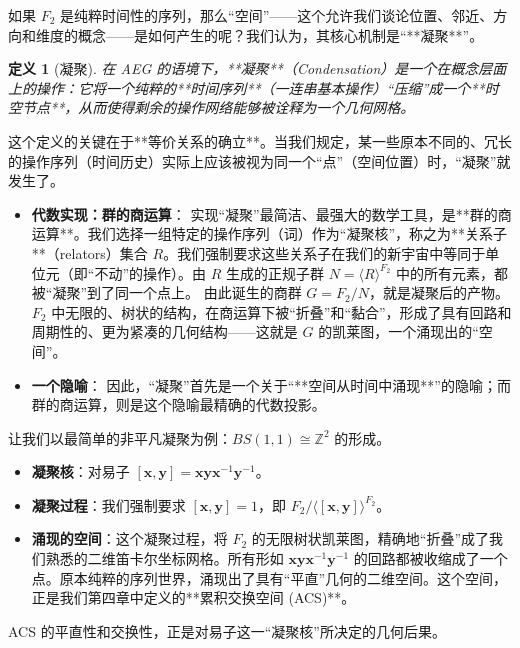 \documentclass[a4paper,12pt]{book}
\numberwithin{problem}{section}
\newtheorem{definition}{定义}
\numberwithin{definition}{section}
\numberwithin{lemma}{section}
\numberwithin{proposition}{section}
\numberwithin{theorem}{section}
\numberwithin{grammar}{section}
\numberwithin{program}{section}
\numberwithin{convention}{section}
\numberwithin{corollary}{section}
\begin{document}
如果 $F_2$ 是纯粹时间性的序列，那么“空间”——这个允许我们谈论位置、邻近、方向和维度的概念——是如何产生的呢？我们认为，其核心机制是“**凝聚**”。

\begin{definition}[凝聚]
    \label{def:condensation}
    在 AEG 的语境下，**凝聚**（Condensation）是一个在概念层面上的操作：它将一个纯粹的**时间序列**（一连串基本操作）“压缩”成一个**时空节点**，从而使得剩余的操作网络能够被诠释为一个几何网格。
\end{definition}

这个定义的关键在于**等价关系的确立**。当我们规定，某一些原本不同的、冗长的操作序列（时间历史）实际上应该被视为同一个“点”（空间位置）时，“凝聚”就发生了。

\begin{itemize}
    \item \textbf{代数实现：群的商运算}：
    实现“凝聚”最简洁、最强大的数学工具，是**群的商运算**。我们选择一组特定的操作序列（词）作为“凝聚核”，称之为**关系子**（relators）集合 $R$。我们强制要求这些关系子在我们的新宇宙中等同于单位元（即“不动”的操作）。由 $R$ 生成的正规子群 $N = \langle R \rangle^{F_2}$ 中的所有元素，都被“凝聚”到了同一个点上。
    由此诞生的商群 $G = F_2 / N$，就是凝聚后的产物。$F_2$ 中无限的、树状的结构，在商运算下被“折叠”和“黏合”，形成了具有回路和周期性的、更为紧凑的几何结构——这就是 $G$ 的凯莱图，一个涌现出的“空间”。

    \item \textbf{一个隐喻}：
    因此，“凝聚”首先是一个关于“**空间从时间中涌现**”的隐喻；而群的商运算，则是这个隐喻最精确的代数投影。
\end{itemize}

让我们以最简单的非平凡凝聚为例：$BS(1,1) \cong \mathbb{Z}^2$ 的形成。
\begin{itemize}
    \item \textbf{凝聚核}：对易子 $[\mathbf{x}, \mathbf{y}] = \mathbf{x}\mathbf{y}\mathbf{x}^{-1}\mathbf{y}^{-1}$。
    \item \textbf{凝聚过程}：我们强制要求 $[\mathbf{x}, \mathbf{y}] = 1$，即 $F_2 / \langle [\mathbf{x}, \mathbf{y}] \rangle^{F_2}$。
    \item \textbf{涌现的空间}：这个凝聚过程，将 $F_2$ 的无限树状凯莱图，精确地“折叠”成了我们熟悉的二维笛卡尔坐标网格。所有形如 $\mathbf{x}\mathbf{y}\mathbf{x}^{-1}\mathbf{y}^{-1}$ 的回路都被收缩成了一个点。原本纯粹的序列世界，涌现出了具有“平直”几何的二维空间。这个空间，正是我们第四章中定义的**累积交换空间 (ACS)**。
\end{itemize}
ACS 的平直性和交换性，正是对易子这一“凝聚核”所决定的几何后果。
\end{document}
